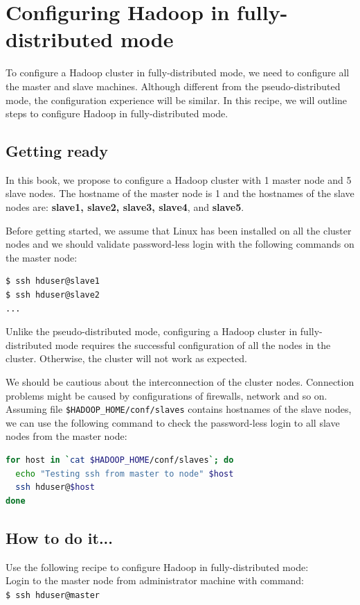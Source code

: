 \section{Configuring Hadoop in fully-distributed mode}
To configure a Hadoop cluster in fully-distributed mode, we need to configure all the master and slave machines. Although different from the pseudo-distributed mode, the configuration experience will be similar.  In this recipe, we will outline steps to configure Hadoop in fully-distributed mode.
\subsection*{Getting ready}
In this book, we propose to configure a Hadoop cluster with 1 master node and 5 slave nodes. The hostname of the master node is 1 and the hostnames of the slave nodes are: \textbf{slave1, slave2, slave3, slave4}, and \textbf{slave5}.

Before getting started, we assume that Linux has been installed on all the cluster nodes and we should validate password-less login with the following commands on the master node:
\lstset{style=bashstyle}
\begin{lstlisting}[language=bash]
$ ssh hduser@slave1
$ ssh hduser@slave2
...
\end{lstlisting}
Unlike the pseudo-distributed mode, configuring a Hadoop cluster in fully-distributed mode requires the successful configuration of all the nodes in the cluster. Otherwise, the cluster will not work as expected.

We should be cautious about the interconnection of the cluster nodes. Connection problems might be caused by configurations of firewalls, network and so on.
Assuming file \verb|$HADOOP_HOME/conf/slaves| contains hostnames of the slave nodes, we can use the following command to check the password-less login to all slave nodes from the master node: 
\lstset{style=bashstyle}
\begin{lstlisting}[language=bash]
for host in `cat $HADOOP_HOME/conf/slaves`; do
  echo "Testing ssh from master to node" $host
  ssh hduser@$host
done
\end{lstlisting}

\subsection*{How to do it...}
Use the following recipe to configure Hadoop in fully-distributed mode: \\
Login to the master node from administrator machine with command: \\
\verb|$ ssh hduser@master|

